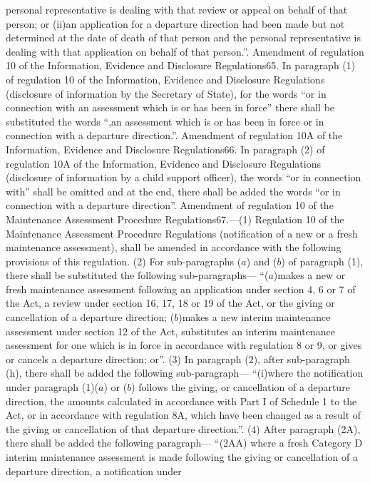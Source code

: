\documentclass[a4paper]{article}
\begin{document}
personal representative is dealing with that review or appeal on behalf of that
person; or
(ii)an application for a departure direction had been made but not determined at
the date of death of that person and the personal representative is dealing with
that application on behalf of that person.”.
Amendment of regulation 10 of the Information, Evidence and Disclosure
Regulations65. In paragraph (1) of regulation 10 of the Information, Evidence
and Disclosure Regulations (disclosure of information by the Secretary of
State), for the words “or in connection with an assessment which is or has been
in force” there shall be substituted the words “,an assessment which is or has
been in force or in connection with a departure direction.”.
Amendment of regulation 10A of the Information, Evidence and Disclosure
Regulations66. In paragraph (2) of regulation 10A of the Information, Evidence
and Disclosure Regulations (disclosure of information by a child support
officer), the words “or in connection with” shall be omitted and at the end,
there shall be added the words “or in connection with a departure direction”.
Amendment of regulation 10 of the Maintenance Assessment Procedure
Regulations67.—(1) Regulation 10 of the Maintenance Assessment Procedure
Regulations (notification of a new or a fresh maintenance assessment), shall be
amended in accordance with the following provisions of this regulation.
(2) For sub-paragraphs ($a$) and ($b$) of paragraph (1), there shall be substituted
the following sub-paragraphs—
“($a$)makes a new or fresh maintenance assessment following an application under
section 4, 6 or 7 of the Act, a review under section 16, 17, 18 or 19 of the
Act, or the giving or cancellation of a departure direction;
($b$)makes a new interim maintenance assessment under section 12 of the Act,
substitutes an interim maintenance assessment for one which is in force in
accordance with regulation 8 or 9, or gives or cancels a departure direction;
or”.
(3) In paragraph (2), after sub-paragraph (h), there shall be added the
following sub-paragraph—
“(i)where the notification under paragraph (1)($a$) or ($b$) follows the giving, or
cancellation of a departure direction, the amounts calculated in accordance with
Part I of Schedule 1 to the Act, or in accordance with regulation 8A, which have
been changed as a result of the giving or cancellation of that departure
direction.”.
(4) After paragraph (2A), there shall be added the following paragraph—
“(2AA) where a fresh Category D interim maintenance assessment is made following
the giving or cancellation of a departure direction, a notification under
\end{document}
